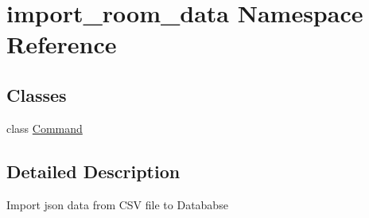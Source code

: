 \hypertarget{namespaceimport__room__data}{\section{import\-\_\-room\-\_\-data Namespace Reference}
\label{namespaceimport__room__data}
}
\subsection*{Classes}
\begin{DoxyCompactItemize}
\item 
class \hyperlink{classimport__room__data_1_1_command}{Command}
\end{DoxyCompactItemize}


\subsection{Detailed Description}
\begin{DoxyVerb}Import json data from CSV file to Datababse
\end{DoxyVerb}
 